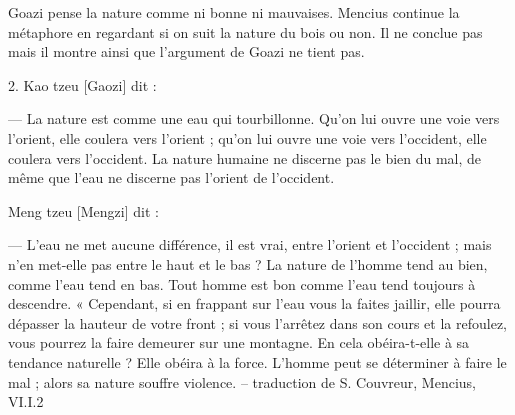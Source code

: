 Goazi pense la nature comme ni bonne ni mauvaises. Mencius continue la métaphore en regardant si on suit la nature du bois ou non. Il ne conclue pas mais il montre ainsi que l'argument de Goazi ne tient pas.


\begin{singlequote}
    2.	Kao tzeu [Gaozi] dit :
    
—	La nature est comme une eau qui tourbillonne. Qu’on lui ouvre une voie vers l’orient, elle coulera vers l’orient ; qu’on lui ouvre une voie vers l’occident, elle coulera vers l’occident. La nature humaine ne discerne pas le bien du mal, de même que l’eau ne discerne pas l’orient de l’occident.


Meng tzeu [Mengzi] dit :

—	L’eau ne met aucune différence, il est vrai, entre l’orient et l’occident ; mais n’en met-elle pas entre le haut et le bas ? La nature de l’homme tend au bien, comme l’eau tend en bas. Tout homme est bon comme l’eau tend toujours à descendre.
« Cependant, si en frappant sur l’eau vous la faites jaillir, elle pourra dépasser la hauteur de votre front ; si vous l’arrêtez dans son cours et la refoulez, vous pourrez la faire demeurer sur une montagne. En cela obéira-t-elle à sa tendance naturelle ? Elle obéira à la force. L’homme peut se déterminer à faire le mal ; alors sa nature souffre violence.
-- traduction de S. Couvreur, Mencius, VI.I.2
\end{singlequote}


